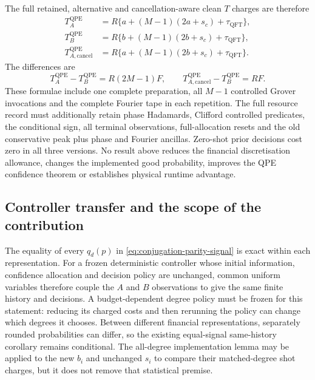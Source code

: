 \documentclass[11pt]{article}
\begin{document}
The full retained, alternative and cancellation-aware clean $T$
charges are therefore
\begin{align}
 T_A^{\mathrm{QPE}}
 &=R\{a+(M-1)(2a+s_c)+\tau_{\mathrm{QFT}}\},
 \label{eq:conjugation-retained-qpe-cost}\\
 T_B^{\mathrm{QPE}}
 &=R\{b+(M-1)(2b+s_c)+\tau_{\mathrm{QFT}}\},
 \label{eq:conjugation-dirty-qpe-cost}\\
 T_{A,\mathrm{cancel}}^{\mathrm{QPE}}
 &=R\{a+(M-1)(2b+s_c)+\tau_{\mathrm{QFT}}\}.
 \label{eq:conjugation-clean-qpe-cost}
\end{align}
The differences are
\begin{equation}
 T_A^{\mathrm{QPE}}-T_B^{\mathrm{QPE}}=R(2M-1)F,
 \qquad
 T_{A,\mathrm{cancel}}^{\mathrm{QPE}}-T_B^{\mathrm{QPE}}=RF.
 \label{eq:conjugation-qpe-difference}
\end{equation}
These formulae include one complete preparation, all $M-1$ controlled
Grover invocations and the complete Fourier tape in each repetition.
The full resource record must additionally retain phase Hadamards,
Clifford controlled predicates, the conditional sign, all terminal
observations, full-allocation resets and the old conservative peak
plus phase and Fourier ancillas. Zero-shot prior decisions cost zero
in all three versions. No result above reduces the financial
discretisation allowance, changes the implemented good probability,
improves the QPE confidence theorem or establishes physical runtime
advantage.

\subsection{Controller transfer and the scope of the contribution}

The equality of every $q_d(p)$ in
\eqref{eq:conjugation-parity-signal} is exact within each representation.
For a frozen deterministic controller whose initial information,
confidence allocation and decision policy are unchanged, common
uniform variables therefore couple the $A$ and $B$ observations to
give the same finite history and decisions. A budget-dependent degree
policy must be frozen for this statement: reducing its charged costs
and then rerunning the policy can change which degrees it chooses.
Between different financial representations, separately rounded
probabilities can differ, so the existing equal-signal same-history
corollary remains conditional. The all-degree implementation lemma
may be applied to the new $b_i$ and unchanged $s_i$ to compare their
matched-degree shot charges, but it does not remove that statistical
premise.
\end{document}
